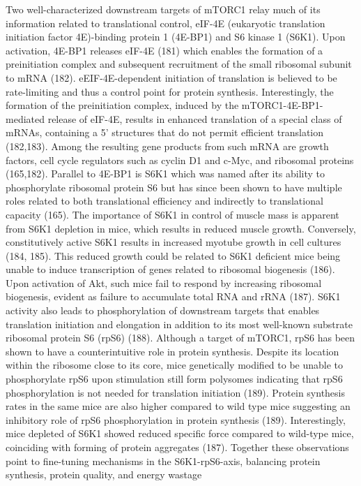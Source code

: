 \documentclass[twoside,10pt]{gihclass} %
\begin{document}
Two well-characterized downstream targets of mTORC1 relay much of its information related to translational control, eIF-4E (eukaryotic translation initiation factor 4E)-binding protein 1 (4E-BP1) and S6 kinase 1 (S6K1).
Upon activation, 4E-BP1 releases eIF-4E
(181)
which enables the formation of a preinitiation complex and subsequent recruitment of the small ribosomal subunit to mRNA
(182).
eEIF-4E-dependent initiation of translation is believed to be rate-limiting and thus a control point for protein synthesis.
Interestingly, the formation of the preinitiation complex, induced by the mTORC1-4E-BP1-mediated release of eIF-4E, results in enhanced translation of a special class of mRNAs, containing a 5' structures that do not permit efficient translation
(182,183).
Among the resulting gene products from such mRNA are growth factors, cell cycle regulators such as cyclin D1 and c-Myc, and ribosomal proteins
(165,182).
Parallel to 4E-BP1 is S6K1 which was named after its ability to phosphorylate ribosomal protein S6 but has since been shown to have multiple roles related to both translational efficiency and indirectly to translational capacity
(165).
The importance of S6K1 in control of muscle mass is apparent from S6K1 depletion in mice, which results in reduced muscle growth. Conversely, constitutively active S6K1 results in increased myotube growth in cell cultures
(184, 185).
This reduced growth could be related to S6K1 deficient mice being unable to induce transcription of genes related to ribosomal biogenesis
(186).
Upon activation of Akt, such mice fail to respond by increasing ribosomal biogenesis, evident as failure to accumulate total RNA and rRNA
(187).
S6K1 activity also leads to phosphorylation of downstream targets that enables translation initiation and elongation in addition to its most well-known substrate ribosomal protein S6 (rpS6)
(188).
Although a target of mTORC1, rpS6 has been shown to have a counterintuitive role in protein synthesis.
Despite its location within the ribosome close to its core, mice genetically modified to be unable to phosphorylate rpS6 upon stimulation still form polysomes indicating that rpS6 phosphorylation is not needed for translation initiation
(189).
Protein synthesis rates in the same mice are also higher compared to wild type mice suggesting an inhibitory role of rpS6 phosphorylation in protein synthesis
(189).
Interestingly, mice depleted of S6K1 showed reduced specific force compared to wild-type mice, coinciding with forming of protein aggregates
(187).
Together these observations point to fine-tuning mechanisms in the S6K1-rpS6-axis, balancing protein synthesis, protein quality, and energy wastage
\end{document}
